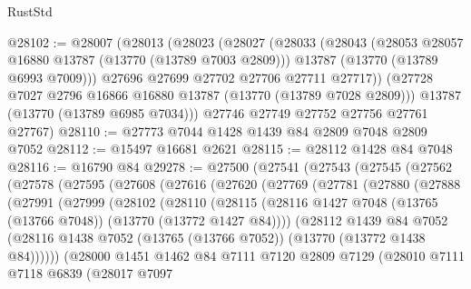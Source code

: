 \begin{lexlean}{RustStd}
\begin{coremodule}
@28102 := @28007
    (@28013
      (@28023
        (@28027
          (@28033
            (@28043
              (@28053 @28057 @16880 @13787 (@13770 (@13789 @7003 @2809)))
              @13787
              (@13770 (@13789 @6993 @7009)))
            @27696
            @27699
            @27702
            @27706
            @27711
            @27717))
        (@27728 @7027 @2796 @16866 @16880 @13787 (@13770 (@13789 @7028 @2809)))
        @13787
        (@13770 (@13789 @6985 @7034)))
      @27746
      @27749
      @27752
      @27756
      @27761
      @27767)
@28110 := @27773 @7044 @1428 @1439 @84 @2809 @7048 @2809 @7052
@28112 := @15497 @16681 @2621
@28115 := @28112 @1428 @84 @7048
@28116 := @16790 @84
@29278 := @27500
    (@27541
      (@27543
        (@27545
          (@27562
            (@27578
              (@27595
                (@27608
                  (@27616
                    (@27620
                      (@27769
                        (@27781
                          (@27880
                            (@27888
                              (@27991
                                (@27999
                                  (@28102
                                    (@28110
                                      (@28115
                                        (@28116
                                          @1427
                                          @7048
                                          (@13765 (@13766 @7048))
                                          (@13770 (@13772 @1427 @84))))
                                      (@28112
                                        @1439
                                        @84
                                        @7052
                                        (@28116
                                          @1438
                                          @7052
                                          (@13765 (@13766 @7052))
                                          (@13770 (@13772 @1438 @84))))))
                                  (@28000
                                    @1451
                                    @1462
                                    @84
                                    @7111
                                    @7120
                                    @2809
                                    @7129
                                    (@28010
                                      @7111
                                      @7118
                                      @6839
                                      (@28017
                                        @7097

\end{coremodule}
\end{lexlean}
